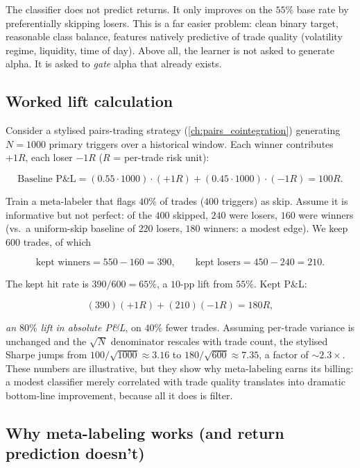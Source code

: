 The classifier does not predict returns. It only improves on the
$55\%$ base rate by preferentially skipping losers. This is a
far easier problem: clean binary target, reasonable class
balance, features natively predictive of trade quality
(volatility regime, liquidity, time of day). Above all, the
learner is not asked to generate alpha. It is asked to
\emph{gate} alpha that already exists.

\subsection{Worked lift calculation}
\label{subsec:ml_meta_lift}

Consider a stylised pairs-trading strategy
(\cref{ch:pairs_cointegration}) generating $N = 1000$ primary
triggers over a historical window. Each winner contributes $+1R$,
each loser $-1R$ ($R$ = per-trade risk unit):

\[
\text{Baseline P\&L} = (0.55 \cdot 1000) \cdot (+1R)
  + (0.45 \cdot 1000) \cdot (-1R) = 100R.
\]

Train a meta-labeler that flags $40\%$ of trades ($400$ triggers)
as skip. Assume it is informative but not perfect: of the $400$
skipped, $240$ were losers, $160$ were winners (vs.\ a
uniform-skip baseline of $220$ losers, $180$ winners: a modest
edge). We keep $600$ trades, of which

\[
\text{kept winners} = 550 - 160 = 390, \qquad
\text{kept losers} = 450 - 240 = 210.
\]

The kept hit rate is $390 / 600 = 65\%$, a $10$-pp lift from
$55\%$. Kept P\&L:

\[
(390)(+1R) + (210)(-1R) = 180R,
\]

\emph{an $80\%$ lift in absolute P\&L}, on $40\%$ fewer trades.
Assuming per-trade variance is unchanged and the
$\sqrt{N}$ denominator rescales with trade count, the stylised
Sharpe jumps from $100 / \sqrt{1000} \approx 3.16$ to
$180 / \sqrt{600} \approx 7.35$, a factor of $\sim 2.3\times$.
These numbers are illustrative, but they show why meta-labeling
earns its billing: a modest classifier merely
correlated with trade quality translates into dramatic
bottom-line improvement, because all it does is filter.

\subsection{Why meta-labeling works (and return prediction doesn't)}
\label{subsec:ml_meta_why}

